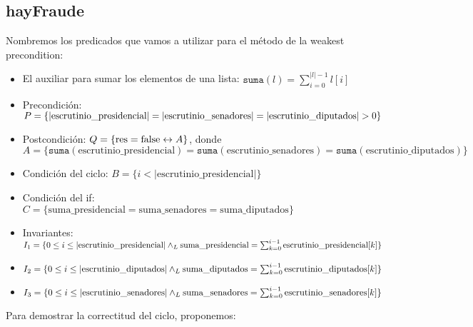 \documentclass[10pt,a4paper]{article}
\newcommand{\predRef}{\texttt}
\newcommand{\var}{\text}
\begin{document}
\subsection{hayFraude}
Nombremos los predicados que vamos a utilizar para el método de la weakest precondition: 
\begin{itemize}
    \item El auxiliar para sumar los elementos de una lista: $\predRef{suma}(l) = \sum_{i=0}^{|l|-1}{l[i]}$
    \item Precondición: $P = \{\longitud{\var{escrutinio\_presidencial}} = \longitud{\var{escrutinio\_senadores}} = \longitud{\var{escrutinio\_diputados}} > 0\}$
    \item Postcondición: $Q = \{\var{res} = \False \Iff A\}$, donde $A = \{\predRef{suma}(\var{escrutinio\_presidencial}) = \predRef{suma}(\var{escrutinio\_senadores}) = \predRef{suma}(\var{escrutinio\_diputados})\}$
    \item Condición del ciclo: $B = \{ i < |\var{escrutinio\_presidencial}| \}$
    \item Condición del if: $C = \{\var{suma\_presidencial} = \var{suma\_senadores} = \var{suma\_diputados}\}$
    \item Invariantes: $I_1 = \{ 0\leq i\leq |\var{escrutinio\_presidencial}|\yLuego \var{suma\_presidencial} = \sum_{k=0}^{i-1}{\var{escrutinio\_presidencial}[k]} \}$
    \item $I_2 = \{ 0\leq i\leq |\var{escrutinio\_diputados}|\yLuego \var{suma\_diputados} = \sum_{k=0}^{i-1}{\var{escrutinio\_diputados}[k]} \}$
    \item $I_3 = \{ 0\leq i\leq |\var{escrutinio\_senadores}|\yLuego \var{suma\_senadores} = \sum_{k=0}^{i-1}{\var{escrutinio\_senadores}[k]} \}$
\end{itemize}
Para demostrar la correctitud del ciclo, proponemos:
\end{document}
